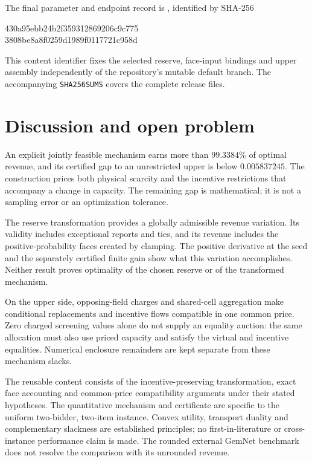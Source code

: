 \documentclass[11pt]{article}
\begin{document}
The final parameter and endpoint record is
, identified by SHA-256
\begin{center}\small\ttfamily
430a95ebb24b2f359312869206c9c775\\
3808be8a8f0259d1989f0117721c958d
\end{center}
This content identifier fixes the selected reserve, face-input bindings and
upper assembly independently of the repository's mutable default branch.
The accompanying \texttt{SHA256SUMS} covers the complete release files.

\section{Discussion and open problem}
An explicit jointly feasible mechanism earns more than $99.3384\%$ of optimal
revenue, and its certified gap to an unrestricted upper is below $0.005837245$.
The construction prices both physical scarcity and the incentive restrictions
that accompany a change in capacity. The remaining gap is mathematical;
it is not a sampling error or an optimization tolerance.

The reserve transformation provides a globally admissible revenue variation.
Its validity includes exceptional reports and ties, and its revenue includes
the positive-probability faces created by clamping. The positive derivative
at the seed and the separately certified finite gain show what this variation
accomplishes. Neither result proves optimality of the chosen reserve or of
the transformed mechanism.

On the upper side, opposing-field charges and shared-cell aggregation make
conditional replacements and incentive flows compatible in one common price.
Zero charged screening values alone do not supply an equality auction: the
same allocation must also use priced capacity and satisfy the virtual and
incentive equalities. Numerical enclosure remainders are kept separate from
these mechanism slacks.

The reusable content consists of the incentive-preserving transformation,
exact face accounting and common-price compatibility arguments under their
stated hypotheses. The quantitative mechanism and certificate are specific
to the uniform two-bidder, two-item instance. Convex utility, transport duality
and complementary slackness are established principles; no first-in-literature
or cross-instance performance claim is made. The rounded external GemNet
benchmark does not resolve the comparison with its unrounded revenue.
\end{document}
